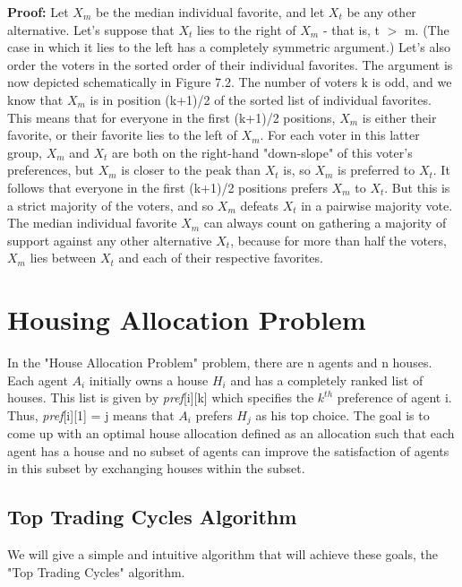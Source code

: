 \documentclass[twoside]{article}
\begin{document}
\textbf{Proof: }
\newline
Let $X_m$ be the median individual favorite, and let $X_t$ be any other alternative. Let's suppose that $X_t$ lies to the right of $X_m$ - that is, t $>$ m. (The case in which it lies to the left has a completely symmetric argument.) Let's also order the voters in the sorted order of their individual favorites.
The argument is now depicted schematically in Figure 7.2. The number of voters k is odd, and we know that $X_m$ is in position (k+1)/2 of the sorted list of individual favorites. This means that for everyone in the first (k+1)/2 positions, $X_m$ is either their favorite, or their favorite lies to the left of $X_m$. For each voter in this latter group, $X_m$ and $X_t$ are both on the right-hand "down-slope" of this voter's preferences, but $X_m$ is closer to the peak than $X_t$ is, so $X_m$ is preferred to $X_t$. It follows that everyone in the first (k+1)/2 positions prefers $X_m$ to $X_t$. But this is a strict majority of the voters, and so $X_m$ defeats $X_t$ in a pairwise majority vote. The median individual favorite $X_m$ can always count on gathering a majority of support against any other alternative $X_t$, because for more than half the voters, $X_m$ lies between $X_t$ and each of their respective favorites.

\section{Housing Allocation Problem}

In the "House Allocation Problem" problem, there are n agents and n houses. Each agent $A_i$ initially owns a house $H_i$ and has a completely ranked list of houses. This list is given by \textit{pref}[i][k] which specifies the $k^{th}$ preference of agent i. Thus, \textit{pref}[i][1] = j means that $A_i$ prefers $H_j$ as his top choice. The goal is to come up with an optimal house allocation defined as an allocation such that each agent has a house and no subset of agents can improve the satisfaction of agents in this subset by exchanging houses within the subset.

\subsection{Top Trading Cycles Algorithm }

We will give a simple and intuitive algorithm that will achieve these goals, the "Top Trading Cycles" algorithm.
\end{document}
